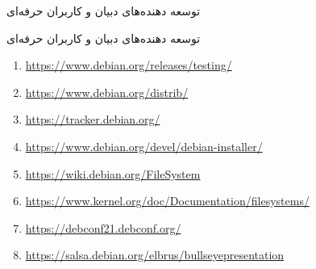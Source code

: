 \documentclass[hyperref={colorlinks}]{beamer}
\begin{document}
\begin{persian}
\begin{frame}{توسعه دهنده‌های دبیان و کاربران حرفه‌ای}
\begin{block}{توسعه دهنده‌های دبیان و کاربران حرفه‌ای}

\begin{latin}
\footnotesize{
\begin{enumerate}
\setlength{\itemsep}{-.1em}
\normalsize\raggedleft

\item \url{https://www.debian.org/releases/testing/}
\item \url{https://www.debian.org/distrib/}
\item \url{https://tracker.debian.org/}
\item \url{https://www.debian.org/devel/debian-installer/}
\item \url{https://wiki.debian.org/FileSystem}
\item \url{https://www.kernel.org/doc/Documentation/filesystems/}
\item \url{https://debconf21.debconf.org/}
\item \url{https://salsa.debian.org/elbrus/bullseyepresentation}
\end{enumerate}
}

\end{latin}

\end{block}
\end{frame}
\end{persian}
\end{document}
